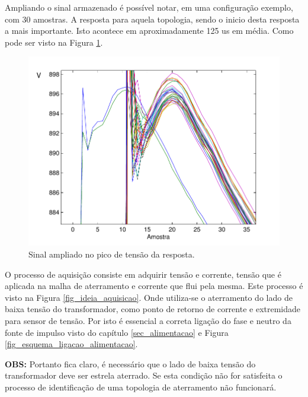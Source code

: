 \documentclass[a4paper, 10pt]{article}
\begin{document}
Ampliando o sinal armazenado é possível notar, em uma configuração exemplo, com 30
amostras. A resposta para aquela topologia, sendo o inicio desta resposta a mais 
importante. Isto acontece em aproximadamente 125 us em média. Como pode ser visto
na Figura \ref{fig_sinal_detalhe}.

\begin{figure}[!h]
    \caption{\label{fig_sinal_detalhe} Sinal ampliado no pico de tensão da resposta.}
	    \begin{center}
            \includegraphics[scale=0.5]{../fotos/sinal/sinal_detalhes-eps-converted-to.pdf}
	    \end{center}
\end{figure}

O processo de aquisição consiste em adquirir tensão e corrente, tensão 
que é aplicada na malha de aterramento e corrente que flui pela mesma. 
Este processo é visto na Figura \ref{fig_ideia_aquisicao}. Onde utiliza-se
o aterramento do lado de baixa tensão do transformador, como ponto de retorno
de corrente e extremidade para sensor de tensão. Por isto é essencial a 
correta ligação do fase e neutro da fonte de impulso visto do capítulo \ref{sec_alimentacao}
e Figura \ref{fig_esquema_ligacao_alimentacao}.

\textbf{OBS:} Portanto fica claro, é necessário que o lado de baixa tensão
do transformador deve ser estrela aterrado. Se esta condição não for 
satisfeita o processo de identificação de uma topologia de aterramento não 
funcionará.
\end{document}
